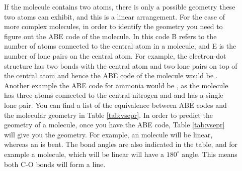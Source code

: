 \documentclass[main.tex]{subfiles}
\begin{document}
\begin{description}
\item[] If the molecule contains two atoms, there is only a possible geometry these two atoms can exhibit, and this is a linear arrangement. For the case of more complex molecules, in order to identify the geometry you need to figure out the ABE code of the molecule. In this code B refers to the number of atoms connected to the central atom in a molecule, and E is the number of lone pairs on the central atom. For example, the electron-dot \hspace{.05in}\hspace{.05in} structure has two bonds with the central atom  and two lone pairs on top of the central atom  and hence the ABE code of the molecule would be . Another example the ABE code for  ammonia  \hspace{.05in}  \hspace{.05in}  would be , as the molecule has three atoms connected to the central nitrogen and and  has a single lone pair. You can find a list of the equivalence between ABE codes and the molecular geometry in Table \ref{tab:vsepr}. In order to predict the geometry of a molecule, once you have the ABE code, Table \ref{tab:vsepr} will give you the geometry. For example, an  molecule will be linear, whereas an  is bent. The bond angles are also indicated in the table, and for example a  molecule, which will be linear will have a $180^{\circ}$ angle. This means both C-O bonds will form a line.




\end{description}
\end{document}

